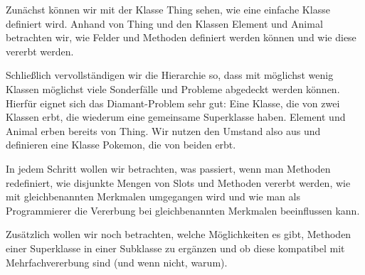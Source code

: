 Zunächst können wir mit der Klasse Thing sehen, wie eine einfache Klasse definiert wird. Anhand von Thing und den Klassen Element und Animal betrachten wir, wie Felder und Methoden definiert werden können und wie diese vererbt werden.

Schließlich vervollständigen wir die Hierarchie so, dass mit möglichst wenig Klassen möglichst viele Sonderfälle und Probleme abgedeckt werden können. Hierfür eignet sich das Diamant-Problem sehr gut: Eine Klasse, die von zwei Klassen erbt, die wiederum eine gemeinsame Superklasse haben. Element und Animal erben bereits von Thing. Wir nutzen den Umstand also aus und definieren eine Klasse Pokemon, die von beiden erbt.

In jedem Schritt wollen wir betrachten, was passiert, wenn man Methoden redefiniert, wie disjunkte Mengen von Slots und Methoden vererbt werden, wie mit gleichbenannten Merkmalen umgegangen wird und wie man als Programmierer die Vererbung bei gleichbenannten Merkmalen beeinflussen kann.

Zusätzlich wollen wir noch betrachten, welche Möglichkeiten es gibt, Methoden einer Superklasse in einer Subklasse zu ergänzen und ob diese kompatibel mit Mehrfachvererbung sind (und wenn nicht, warum).